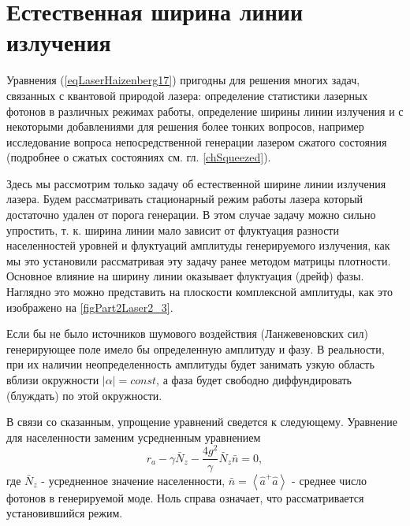 \section{Естественная ширина линии излучения}
Уравнения (\ref{eqLaserHaizenberg17}) пригодны для решения многих
задач, связанных с квантовой природой лазера: определение статистики
лазерных фотонов в различных режимах работы, определение ширины
линии излучения и с некоторыми добавлениями для решения более тонких
вопросов, например исследование вопроса непосредственной генерации
лазером сжатого состояния (подробнее о сжатых состояниях
см. гл. \ref{chSqueezed}). 



Здесь мы рассмотрим только задачу об естественной ширине линии
излучения лазера. Будем рассматривать стационарный режим работы лазера
который достаточно удален от порога генерации. В этом случае задачу
можно сильно упростить, т. к. ширина линии мало зависит от флуктуация
разности населенностей уровней и флуктуаций амплитуды генерируемого
излучения, как мы это установили рассматривая эту задачу ранее методом
матрицы плотности. Основное влияние на ширину линии оказывает
флуктуация (дрейф) фазы. Наглядно это можно представить на плоскости
комплексной амплитуды, как это изображено на
\autoref{figPart2Laser2_3}.

Если бы не было источников шумового воздействия (Ланжевеновских сил)
генерирующее поле имело бы определенную амплитуду и фазу. В
реальности, при их наличии неопределенность амплитуды будет занимать
узкую область вблизи окружности $\left|\alpha\right| = const$, а фаза
будет свободно диффундировать (блуждать) по этой окружности. 

В связи со сказанным, упрощение уравнений сведется к
следующему. Уравнение для населенности заменим усредненным уравнением 
\begin{equation}
r_a - \gamma \bar{N}_z - \frac{4 g^2}{\gamma}\bar{N}_z\bar{n} = 0,
\label{eqLaserHaizenberg19}
\end{equation}
где $\bar{N}_z$ - усредненное значение населенности, $\bar{n} =
\left<\hat{a}^{+}\hat{a}\right>$ - среднее число фотонов в
генерируемой моде. Ноль справа означает, что рассматривается
установившийся режим. 

